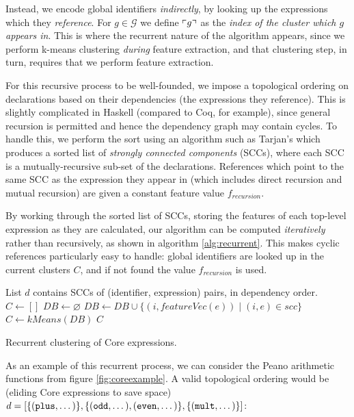 Instead, we encode global identifiers \emph{indirectly}, by looking up the expressions which they \emph{reference}. For $g \in \mathcal{G}$ we define $\left\ulcorner g \right\urcorner$ as the \emph{index of the cluster which $g$ appears in}. This is where the recurrent nature of the algorithm appears, since we perform k-means clustering \emph{during} feature extraction, and that clustering step, in turn, requires that we perform feature extraction.

For this recursive process to be well-founded, we impose a topological ordering on declarations based on their dependencies (the expressions they reference). \iffalse TODO: Maybe explain a little more about topological sorting; i.e. directed graphs, etc. \fi This is slightly complicated in Haskell (compared to Coq, for example), since general recursion is permitted and hence the dependency graph may contain cycles. To handle this, we perform the sort using an algorithm such as Tarjan's which produces a sorted list of \emph{strongly connected components} (SCCs), where each SCC is a mutually-recursive sub-set of the declarations. References which point to the same SCC as the expression they appear in (which includes direct recursion and mutual recursion) are given a constant feature value $f_{recursion}$.

By working through the sorted list of SCCs, storing the features of each top-level expression as they are calculated, our algorithm can be computed \emph{iteratively} rather than recursively, as shown in algorithm \ref{alg:recurrent}. This makes cyclic references particularly easy to handle: global identifiers are looked up in the current clusters $C$, and if not found the value $f_{recursion}$ is used.

\begin{algorithm}
  \begin{algorithmic}[1]
    \Require List $d$ contains SCCs of (identifier, expression) pairs, in dependency order.
      \State $C  \gets []$
      \State $DB \gets \varnothing$
        \State $DB \gets DB \cup \{(i, featureVec(e)) \mid (i, e) \in scc\}$
        \State $C  \gets kMeans(DB)$
      \EndFor
      \Return $C$
    \EndProcedure
  \end{algorithmic}
  \caption{Recurrent clustering of Core expressions.}
  \label{alg:recurrent}
\end{algorithm}

As an example of this recurrent process, we can consider the Peano arithmetic functions from figure \ref{fig:coreexample}. A valid topological ordering would be (eliding Core expressions to save space) $d = [\{(\texttt{plus}, \dots)\}, \{(\texttt{odd}, \dots), (\texttt{even}, \dots)\}, \{(\texttt{mult}, \dots)\}]$:

